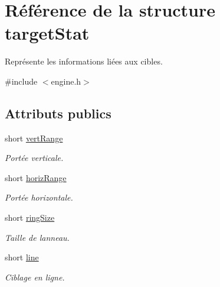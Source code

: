 \hypertarget{structtargetStat}{}\section{Référence de la structure target\+Stat}
\label{structtargetStat}


Représente les informations liées aux cibles.  




{\ttfamily \#include $<$engine.\+h$>$}

\subsection*{Attributs publics}
\begin{DoxyCompactItemize}
\item 
\hypertarget{structtargetStat_a70d37dfedfb05d72d8c8cfcd575f812c}{}short \hyperlink{structtargetStat_a70d37dfedfb05d72d8c8cfcd575f812c}{vert\+Range}\label{structtargetStat_a70d37dfedfb05d72d8c8cfcd575f812c}

\begin{DoxyCompactList}\small\item\em Portée verticale. \end{DoxyCompactList}\item 
\hypertarget{structtargetStat_a2a4322825a13f8815c889056b123c09b}{}short \hyperlink{structtargetStat_a2a4322825a13f8815c889056b123c09b}{horiz\+Range}\label{structtargetStat_a2a4322825a13f8815c889056b123c09b}

\begin{DoxyCompactList}\small\item\em Portée horizontale. \end{DoxyCompactList}\item 
\hypertarget{structtargetStat_add6382059773722d55c40daff5b3efdc}{}short \hyperlink{structtargetStat_add6382059773722d55c40daff5b3efdc}{ring\+Size}\label{structtargetStat_add6382059773722d55c40daff5b3efdc}

\begin{DoxyCompactList}\small\item\em Taille de l\textquotesingle{}anneau. \end{DoxyCompactList}\item 
\hypertarget{structtargetStat_a178aadea19548628774763db12cdeb24}{}short \hyperlink{structtargetStat_a178aadea19548628774763db12cdeb24}{line}\label{structtargetStat_a178aadea19548628774763db12cdeb24}

\begin{DoxyCompactList}\small\item\em Ciblage en ligne. \end{DoxyCompactList}\end{DoxyCompactItemize}


